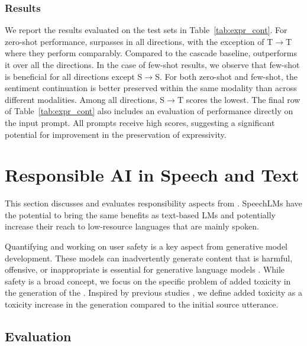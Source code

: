 \subsubsection{Results}
We report the results evaluated on the test sets in Table~\ref{tab:expr_cont}. For zero-shot performance, \spotexpressive surpasses \spotbase in all directions, with the exception of T$\rightarrow$T where they perform comparably. Compared to the cascade baseline, \spotexpressive outperforms it over all the directions. In the case of few-shot results, we observe that few-shot is beneficial for all directions except S$\rightarrow$S. For both zero-shot and few-shot, the sentiment continuation is better preserved within the same modality than across different modalities. Among all directions, S$\rightarrow$T scores the lowest. The final row of Table~\ref{tab:expr_cont} also includes an evaluation of performance directly on the input prompt. All prompts receive high scores, suggesting a significant potential for improvement in the preservation of expressivity.

\section{Responsible AI in Speech and Text}\label{sec:responsible}
This section discusses and evaluates responsibility aspects from \spot. SpeechLMs have the potential to bring the same benefits as text-based LMs and potentially increase their reach to low-resource languages that are mainly spoken. %

Quantifying and working on user safety is a key aspect from generative model development. These models can inadvertently generate content that is harmful, offensive, or inappropriate is essential for generative language models \cite{deshpande2023toxicity, touvron2023llama}. While safety is a broad concept, we focus on the specific problem of added toxicity in the generation of the \spot. Inspired by previous studies \cite{communication2023seamlessm4t}, we define added toxicity as a toxicity increase in the generation compared to the initial source utterance.
\subsection{Evaluation}
